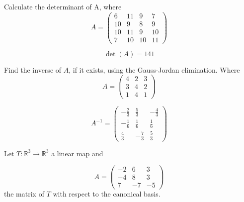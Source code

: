 \begin{questions}

\question Calculate the determinant of A, where
$$
A=\left(\begin{array}{rrrr}
6 & 11 & 9 & 7 \\
10 & 9 & 8 & 9 \\
10 & 11 & 9 & 10 \\
7 & 10 & 10 & 11
\end{array}\right)
$$

\begin{solution}
$$\det(A)=141$$
\end{solution}

\question Find the inverse of $A$, if it exists, using the Gauss-Jordan elimination. Where
$$
A=\left(\begin{array}{rrr}
4 & 2 & 3 \\
3 & 4 & 2 \\
1 & 4 & 1
\end{array}\right)
$$

\begin{solution}
$$A^{-1}=\left(\begin{array}{rrr}
-\frac{2}{3} & \frac{5}{3} & -\frac{4}{3} \\
-\frac{1}{6} & \frac{1}{6} & \frac{1}{6} \\
\frac{4}{3} & -\frac{7}{3} & \frac{5}{3}
\end{array}\right)$$
\end{solution}

\question Let $T:\mathbb{R}^3\rightarrow\mathbb{R}^3$  a linear map and
 
$$
A=\left(\begin{array}{rrr}
-2 & 6 & 3 \\
-4 & 8 & 3 \\
7 & -7 & -5
\end{array}\right)
$$
the matrix of $T$ with respect to the canonical basis.
\end{questions}
